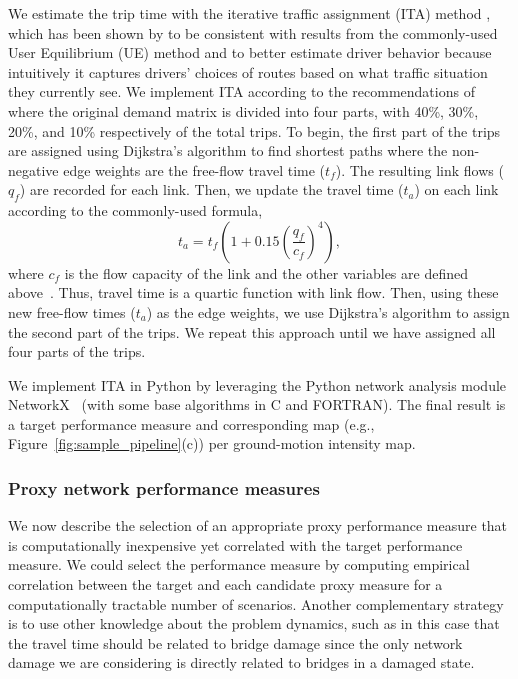 We estimate the trip time with the iterative traffic assignment (ITA) method \cite{chen_network_1991}, which has been shown by \cite{wang_understanding_2012} to be consistent with results from the commonly-used User Equilibrium (UE) method and to better estimate driver behavior because intuitively it captures drivers' choices of routes based on what traffic situation they currently see. We implement ITA according to the recommendations of \cite{wang_understanding_2012}  where the original demand matrix is divided into four parts, with 40\%, 30\%, 20\%, and 10\% respectively of the total trips. To begin, the first part of the trips are assigned using Dijkstra's algorithm to find shortest paths where the non-negative edge weights are the free-flow travel time ($t_f$). The resulting link flows ($q_f$) are recorded for each link. Then, we update the travel time ($t_a$) on each link according to the commonly-used formula, 
\begin{equation}
t_a = t_f \left( 1 + 0.15 \left( \frac{q_f}{c_f}\right)^{4}\right),
\end{equation}
where $c_f$ is the flow capacity of the link and the other variables are defined above~\cite{bureau_of_public_roads_traffic_1964}. Thus, travel time is a quartic function with link flow. Then, using these new free-flow times ($t_a$) as the edge weights, we use Dijkstra's algorithm to assign the second part of the trips. We repeat this approach until we have assigned all four parts of the trips.

We implement ITA in Python by leveraging the Python network analysis module NetworkX~\cite{hagberg_exploring_2008} (with some base algorithms in C and FORTRAN). The final result is a target performance measure and corresponding map (e.g., Figure~\ref{fig:sample_pipeline}{\color{red}(c)}) per ground-motion intensity map.

\subsubsection{Proxy network performance measures}
We now describe the selection of an appropriate proxy performance measure that is computationally inexpensive yet correlated with the target performance measure. We could select the performance measure by computing empirical correlation between the target and each candidate proxy measure for a computationally tractable number of scenarios. Another complementary strategy is to use other knowledge about the problem dynamics, such as in this case that the travel time should be related to bridge damage since the only network damage we are considering is directly related to bridges in a damaged state.  

